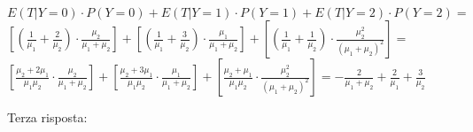 \documentclass{oxmathproblems}
\begin{document}
\begin{questions}
\begin{solution}
\begin{enumerate}[label=(\alph*)]
        $E(T | Y=0) \cdot P(Y=0) + E(T | Y=1) \cdot P(Y=1) + E(T | Y=2) \cdot P(Y=2) =$\\
        $[(\frac{1}{\mu_1} + \frac{2}{\mu_2})\cdot \frac{\mu_2}{\mu_1+\mu_2}] +  [(\frac{1}{\mu_1} + \frac{3}{\mu_2})\cdot \frac{\mu_1}{\mu_1+\mu_2}] +[ (\frac{1}{\mu_1}+\frac{1}{\mu_2}) \cdot \frac{\mu_2^2}{(\mu_1+\mu_2)^2}] =$\\
        $
        [\frac{\mu_2 + 2\mu_1}{\mu_1\mu_2} \cdot \frac{\mu_2}{\mu_1+\mu_2}] +  [\frac{\mu_2 + 3\mu_1}{\mu_1\mu_2} \cdot \frac{\mu_1}{\mu_1+\mu_2}] +[ \frac{\mu_2 + \mu_1}{\mu_1\mu_2} \cdot \frac{\mu_2^2}{(\mu_1+\mu_2)^2}]=
        -\frac{2}{\mu_1+\mu_2} + \frac{2}{\mu_1} +\frac{3}{\mu_2}$
    \end{enumerate}
\end{solution}

\miquestion
Terza risposta: 


\end{questions}
\end{document}
